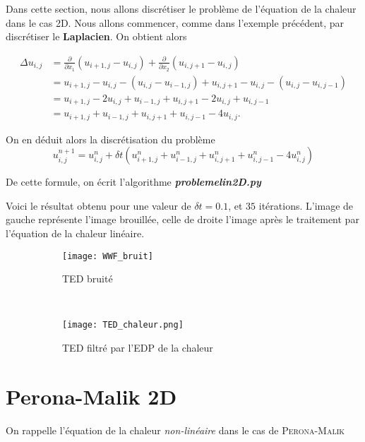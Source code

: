 \documentclass[a4paper,12pt,twoside]{report}
\newcommand{\1}{\mathbb{1}}
\begin{document}
	Dans cette section, nous allons discrétiser le problème de l'équation de la chaleur dans le cas 2D. Nous allons commencer, comme dans l'exemple précédent, par discrétiser le \textbf{Laplacien}. On obtient alors 
	
	\begin{align*}
	\Delta u_{i,j}
	& =  \frac{\partial}{\partial x_1}(u_{i+1,j}-u_{i,j})+\frac{\partial}{\partial x_2}(u_{i,j+1}-u_{i,j}) \\
	& =  u_{i+1,j}-u_{i,j}-(u_{i,j}-u_{i-1,j}) + u_{i,j+1}-u_{i,j}-(u_{i,j}-u_{i,j-1})  \\
	& =  u_{i+1,j}-2u_{i,j}+u_{i-1,j} + u_{i,j+1}-2u_{i,j}+u_{i,j-1} \\
	& =  u_{i+1,j}+u_{i-1,j}+u_{i,j+1}+u_{i,j-1}-4u_{i,j}.
	\end{align*}
	
	On en déduit alors la discrétisation du problème 
	\[
	u^{n+1}_{i,j} = u^{n}_{i,j} + \delta t(u^{n}_{i+1,j}+u^{n}_{i-1,j}+u^{n}_{i,j+1}+u^{n}_{i,j-1}-4u^{n}_{i,j})
	\]
	
	De cette formule, on écrit l'algorithme \emph{\textbf{problemelin2D.py}}

	
	Voici le résultat obtenu pour une valeur de $\delta t = 0.1$, et $35$ itérations. L'image de gauche représente l'image brouillée, celle de droite l'image après le traitement par l'équation de la chaleur linéaire.
	
	\begin{figure}[htbp]
    \centering
    \begin{subfigure}[b]{0.45\textwidth}
        \centering \texttt{[image: WWF\_bruit]}
        \caption{TED bruité}
    \end{subfigure}
    ~
    \begin{subfigure}[b]{0.45\textwidth}
        \centering \texttt{[image: TED\_chaleur.png]}
        \caption{TED filtré par l'EDP de la chaleur}
    \end{subfigure}
    \caption{}
	\end{figure}

	
	\section*{Perona-Malik 2D}
	
	On rappelle l'équation de la chaleur \emph{non-linéaire} dans le cas de \textsc{Perona-Malik}
	
\end{document}
